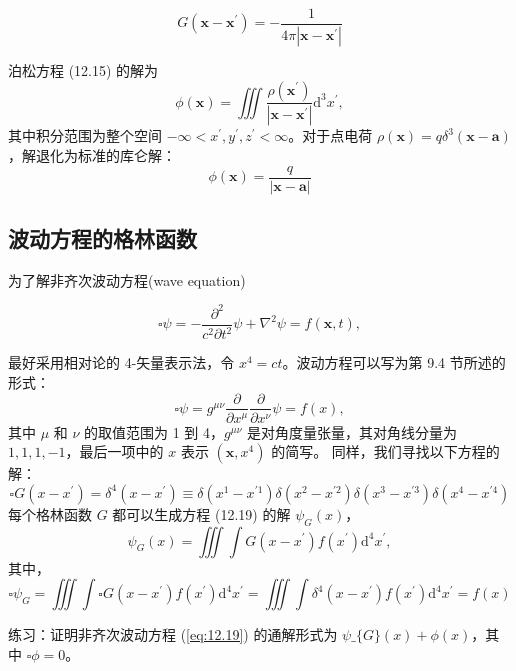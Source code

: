 \begin{equation}\label{eq:12.18} 
 G\left(\mathbf{x}-\mathbf{x}^{\prime}\right)=-\frac{1}{4 \pi\left|\mathbf{x}-\mathbf{x}^{\prime}\right|} 
 \end{equation}

泊松方程 (12.15) 的解为
 $$
\phi(\mathbf{x})=\iiint \frac{\rho\left(\mathbf{x}^{\prime}\right)}{\left|\mathbf{x}-\mathbf{x}^{\prime}\right|} \mathrm{d}^{3} x^{\prime},
$$
其中积分范围为整个空间
$-\infty<x^{\prime}, y^{\prime}, z^{\prime}<\infty$。对于点电荷
$\rho(\mathbf{x})=q \delta^{3}(\mathbf{x}-\mathbf{a})$，解退化为标准的库仑解：
 $$
\phi(\mathbf{x})=\frac{q}{|\mathbf{x}-\mathbf{a}|}
$$
\subsection{波动方程的格林函数}

为了解非齐次波动方程(wave equation)

\begin{equation}\label{eq:12.19} 
 \square \psi=-\frac{\partial^{2}}{c^{2} \partial t^{2}} \psi+\nabla^{2} \psi=f(\mathbf{x}, t), 
 \end{equation}

最好采用相对论的 4-矢量表示法，令 $x^{4}=c t$。波动方程可以写为第 9.4
节所述的形式：
 $$
\square \psi=g^{\mu \nu} \frac{\partial}{\partial x^{\mu}} \frac{\partial}{\partial x^{\nu}} \psi=f(x),
$$
其中 $\mu$ 和 $\nu$ 的取值范围为 1 到 4，$g^{\mu \nu}$
是对角度量张量，其对角线分量为 $1,1,1,-1$，最后一项中的 $x$ 表示
$\left(\mathbf{x}, x^{4}\right)$ 的简写。 同样，我们寻找以下方程的解：
\begin{equation}\label{eq:12.20} 
 \square G\left(x-x^{\prime}\right)=\delta^{4}\left(x-x^{\prime}\right) \equiv \delta\left(x^{1}-x^{\prime 1}\right) \delta\left(x^{2}-x^{\prime 2}\right) \delta\left(x^{3}-x^{\prime 3}\right) \delta\left(x^{4}-x^{\prime 4}\right) 
 \end{equation}
每个格林函数 $G$ 都可以生成方程 (12.19) 的解 $\psi_{G}(x)$，
 $$
\psi_{G}(x)=\iiint \int G\left(x-x^{\prime}\right) f\left(x^{\prime}\right) \mathrm{d}^{4} x^{\prime},
$$
其中，
 $$
\square \psi_{G}=\iiint \int \square G\left(x-x^{\prime}\right) f\left(x^{\prime}\right) \mathrm{d}^{4} x^{\prime}=\iiint \int \delta^{4}\left(x-x^{\prime}\right) f\left(x^{\prime}\right) \mathrm{d}^{4} x^{\prime}=f(x)
$$
\begin{exercise}
  练习：证明非齐次波动方程 (\ref{eq:12.19}) 的通解形式为 $ \psi\_\{G\}(x)+\phi(x)$，其中 $\square \phi=0$。
\end{exercise}

